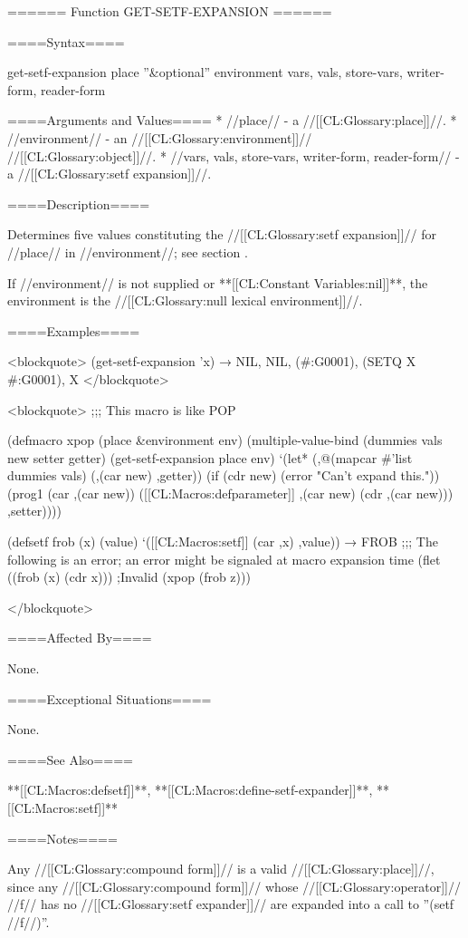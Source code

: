 ====== Function GET-SETF-EXPANSION ======

====Syntax====

\DefunWithValuesNewline get-setf-expansion {place ''&optional'' environment} {vars, vals, store-vars, writer-form, reader-form}

====Arguments and Values====
  * //place// - a //[[CL:Glossary:place]]//.
  * //environment// - an //[[CL:Glossary:environment]]// //[[CL:Glossary:object]]//.
  * //vars, vals, store-vars, writer-form, reader-form// - a //[[CL:Glossary:setf expansion]]//.

====Description====

Determines five values constituting the //[[CL:Glossary:setf expansion]]// for //place// in //environment//; see section {\secref\SetfExpansions}.



If //environment// is not supplied or **[[CL:Constant Variables:nil]]**, the environment is the //[[CL:Glossary:null lexical environment]]//.

====Examples====

<blockquote> (get-setf-expansion 'x) → NIL, NIL, (#:G0001), (SETQ X #:G0001), X </blockquote>

<blockquote> ;;; This macro is like POP

(defmacro xpop (place &environment env) (multiple-value-bind (dummies vals new setter getter) (get-setf-expansion place env) `(let* (,@(mapcar #'list dummies vals) (,(car new) ,getter)) (if (cdr new) (error "Can't expand this.")) (prog1 (car ,(car new)) ([[CL:Macros:defparameter]] ,(car new) (cdr ,(car new))) ,setter))))

(defsetf frob (x) (value) `([[CL:Macros:setf]] (car ,x) ,value)) → FROB ;;; The following is an error; an error might be signaled at macro expansion time (flet ((frob (x) (cdr x))) ;Invalid (xpop (frob z)))

</blockquote>



====Affected By====

None.

====Exceptional Situations====

None.

====See Also====

**[[CL:Macros:defsetf]]**, **[[CL:Macros:define-setf-expander]]**, **[[CL:Macros:setf]]**

====Notes====

Any //[[CL:Glossary:compound form]]// is a valid //[[CL:Glossary:place]]//, since any //[[CL:Glossary:compound form]]// whose //[[CL:Glossary:operator]]// //f// has no //[[CL:Glossary:setf expander]]// are expanded into a call to ''(setf //f//)''.

    
